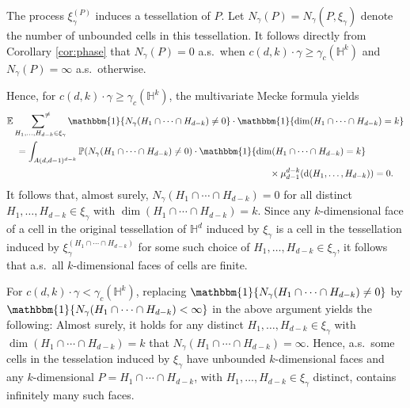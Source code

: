 \documentclass[12pt,a4paper]{article}
\theoremstyle{definition}
\renewcommand{\H}{\mathbb{H}}
\newcommand{\E}{\mathbb{E}}
\renewcommand{\P}{\mathbb{P}}
\newcommand{\dint}{{\rm d}}
\newcommand{\one}{\mathbbm{1}}
\begin{document}
The process $\xi_\gamma^{(P)}$ induces a tessellation of $P$.
Let $N_\gamma(P) = N_\gamma(P,\xi_\gamma)$ denote the number of unbounded cells in this tessellation.
It follows directly from Corollary \ref{cor:phase} that $N_\gamma(P) = 0$ a.s.\ when $c(d,k)\cdot\gamma \geq \gamma_c(\H^k)$ and $N_\gamma(P) = \infty$ a.s.\ otherwise.

Hence, for $c(d,k)\cdot\gamma \geq \gamma_c(\H^k)$, the multivariate Mecke formula yields
\begin{align*}
    &\E\mathop{\sideset{}{^{\neq}}\sum}_{H_1,\ldots,H_{d-k}\in\xi_\gamma} \one\{N_\gamma(H_1\cap\cdots\cap H_{d-k})\neq 0\}
    \cdot \one\{\dim(H_1\cap\cdots\cap H_{d-k})=k\}\\
    &\quad= \int_{A(d,d-1)^{d-k}} \P(N_\gamma(H_1\cap\cdots\cap H_{d-k})\neq 0) 
    \cdot \one\{\dim(H_1\cap\cdots\cap H_{d-k})=k\}\\
    &\hspace*{10cm}\times\mu_{d-1}^{d-k}(\dint(H_1,\ldots,H_{d-k})) = 0.
\end{align*}
It follows that, almost surely, $N_\gamma(H_1\cap\cdots\cap H_{d-k}) = 0$ for all distinct $H_1,\ldots,H_{d-k} \in \xi_\gamma$ with $\dim(H_1\cap\cdots\cap H_{d-k})=k$.
Since any $k$-dimensional face of a cell in the original tessellation of $\H^d$ induced by $\xi_\gamma$ is a cell in the tessellation induced by $\xi_\gamma^{(H_1\cap\cdots\cap H_{d-k})}$ for some such choice of $H_1,\ldots,H_{d-k} \in \xi_\gamma$, it follows that a.s.\ all $k$-dimensional faces of cells are finite.

For $c(d,k)\cdot\gamma < \gamma_c(\H^k)$, replacing $\one\{N_\gamma(H_1\cap\cdots\cap H_{d-k})\neq 0\}$ by $\one\{N_\gamma(H_1\cap\cdots\cap H_{d-k}) < \infty\}$ in the above argument yields the following:
Almost surely, it holds for any distinct $H_1,\ldots,H_{d-k} \in \xi_\gamma$ with $\dim(H_1\cap\cdots\cap H_{d-k})=k$ that $N_\gamma(H_1\cap \cdots\cap H_{d-k}) = \infty$.
Hence, a.s.\ some cells in the tesselation induced by $\xi_\gamma$ have unbounded $k$-dimensional faces and any $k$-dimensional $P = H_1\cap \cdots \cap H_{d-k}$, with $H_1,\ldots,H_{d-k} \in \xi_\gamma$ distinct, contains infinitely many such faces.
 
\end{document}
